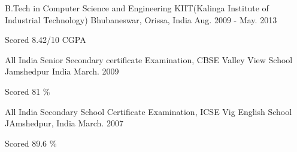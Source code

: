 

\begin{cventries}

  \cventry
    {B.Tech in Computer Science and Engineering} %
    {KIIT(Kalinga Institute of Industrial Technology)} %
    {Bhubaneswar, Orissa, India} %
    {Aug. 2009 - May. 2013} %
    {
      \begin{cvitems} %
        \item {Scored 8.42/10 CGPA}
      \end{cvitems}
    }

  \cventry
    {All India Senior Secondary certificate Examination, CBSE} %
    {Valley View School} %
    {Jamshedpur India} %
    {March. 2009} %
    {
      \begin{cvitems} %
        \item {Scored 81 \%}
      \end{cvitems}
    }


  \cventry
    {All India Secondary School Certificate Examination, ICSE} %
    {Vig English School} %
    {JAmshedpur, India} %
    {March. 2007} %
    {
      \begin{cvitems} %
        \item {Scored 89.6 \%}
      \end{cvitems}
    }

\end{cventries}
